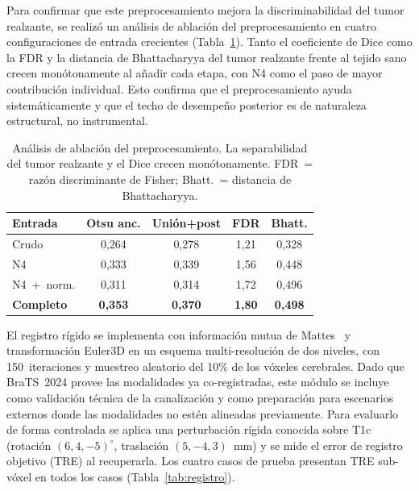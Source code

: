 \documentclass[conference]{IEEEtran}
\begin{document}
Para confirmar que este preprocesamiento mejora la discriminabilidad
del tumor realzante, se realiz\'{o} un an\'{a}lisis de ablaci\'{o}n
del preprocesamiento en cuatro configuraciones de entrada crecientes
(Tabla~\ref{tab:ablation}).
Tanto el coeficiente de Dice como la FDR y la distancia de
Bhattacharyya del tumor realzante frente al tejido sano crecen
mon\'{o}tonamente al a\~{n}adir cada etapa, con N4 como el paso de
mayor contribuci\'{o}n individual.
Esto confirma que el preprocesamiento ayuda sistem\'{a}ticamente y
que el techo de desempe\~{n}o posterior es de naturaleza estructural,
no instrumental.

\begin{table}[h]
\centering\small
\caption{An\'{a}lisis de ablaci\'{o}n del preprocesamiento. La
separabilidad del tumor realzante y el Dice crecen
mon\'{o}tonamente. FDR~= raz\'{o}n discriminante de Fisher;
Bhatt.~= distancia de Bhattacharyya.}
\label{tab:ablation}
\begin{tabular}{lcccc}
\toprule
Entrada & Otsu anc. & Uni\'{o}n+post & FDR & Bhatt. \\
\midrule
Crudo & 0,264 & 0,278 & 1,21 & 0,328 \\
N4 & 0,333 & 0,339 & 1,56 & 0,448 \\
N4~+~norm. & 0,311 & 0,314 & 1,72 & 0,496 \\
\textbf{Completo} & \textbf{0,353} & \textbf{0,370} & \textbf{1,80} & \textbf{0,498} \\
\bottomrule
\end{tabular}
\end{table}

El registro r\'{i}gido se implementa con informaci\'{o}n mutua de
Mattes~\cite{mattes2003} y transformaci\'{o}n Euler3D en un esquema
multi-resoluci\'{o}n de dos niveles, con 150~iteraciones y muestreo
aleatorio del 10\% de los v\'{o}xeles cerebrales.
Dado que BraTS~2024 provee las modalidades ya co-registradas, este
m\'{o}dulo se incluye como validaci\'{o}n t\'{e}cnica de la
canalizaci\'{o}n y como preparaci\'{o}n para escenarios externos
donde las modalidades no est\'{e}n alineadas previamente.
Para evaluarlo de forma controlada se aplica una perturbaci\'{o}n
r\'{i}gida conocida sobre T1c (rotaci\'{o}n $(6,4,-5)^\circ$,
traslaci\'{o}n $(5,-4,3)$~mm) y se mide el error de registro
objetivo (TRE) al recuperarla.
Los cuatro casos de prueba presentan TRE sub-v\'{o}xel en todos los
casos (Tabla~\ref{tab:registro}).
\end{document}

